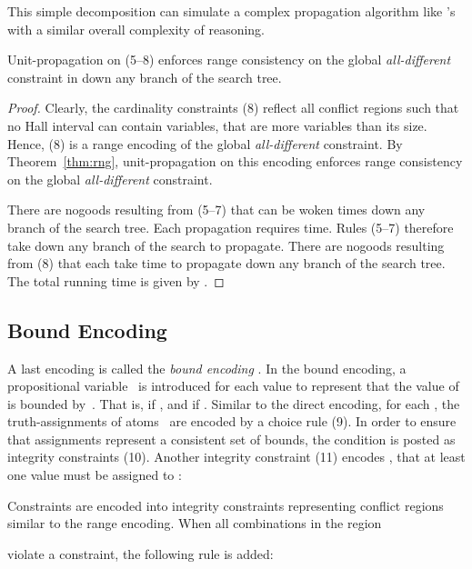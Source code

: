 \documentclass{tlp}
\begin{document}
This simple decomposition can simulate a complex propagation algorithm like 's with a similar overall complexity of reasoning.
\begin{corollary} \label{col:rng}
Unit-propagation on (5--8) enforces range consistency on the global \emph{all-different} constraint in  down any branch of the search tree.
\end{corollary}
\begin{proof}
Clearly, the cardinality constraints (8) reflect all conflict regions such that no Hall interval  can contain  variables, that are more variables than its size. Hence, (8) is a range encoding of the global \emph{all-different} constraint. By Theorem~\ref{thm:rng}, unit-propagation on this encoding enforces range consistency on the global \emph{all-different} constraint.

There are  nogoods resulting from (5--7) that can be woken  times down any branch of the search tree. Each propagation requires  time. Rules (5--7) therefore take  down any branch of the search to propagate. There are  nogoods resulting from (8) that each take  time to propagate down any branch of the search tree. The total running time is given by .
\end{proof}


\subsection{Bound Encoding}

A last encoding is called the \emph{bound encoding} \cite{crba94a}. In the bound encoding, a propositional variable~ is introduced for each value  to represent that the value of~ is bounded by~. That is,  if , and  if . Similar to the direct encoding, for each , the truth-assignments of atoms~ are encoded by a choice rule (9). In order to ensure that assignments represent a consistent set of bounds, the condition  is posted as integrity constraints (10). Another integrity constraint (11) encodes , that at least one value must be assigned to :

Constraints are encoded into integrity constraints representing conflict regions similar to the range encoding. When all combinations in the region

violate a constraint, the following rule is added:
\end{document}
